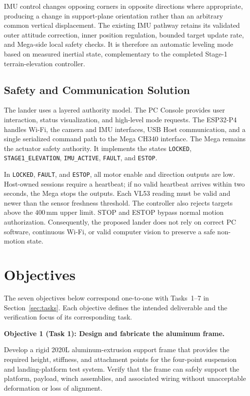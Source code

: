 \documentclass{engr1000j-s2}
\begin{document}
IMU control changes opposing corners in opposite directions where appropriate, producing a change in support-plane orientation rather than an arbitrary common vertical displacement. The existing IMU pathway retains its validated outer attitude correction, inner position regulation, bounded target update rate, and Mega-side local safety checks. It is therefore an automatic leveling mode based on measured inertial state, complementary to the completed Stage-1 terrain-elevation controller.

\subsection*{Safety and Communication Solution}

The lander uses a layered authority model. The PC Console provides user interaction, status visualization, and high-level mode requests. The ESP32-P4 handles Wi-Fi, the camera and IMU interfaces, USB Host communication, and a single serialized command path to the Mega CH340 interface. The Mega remains the actuator safety authority. It implements the states \texttt{LOCKED}, \texttt{STAGE1\_ELEVATION}, \texttt{IMU\_ACTIVE}, \texttt{FAULT}, and \texttt{ESTOP}.

In \texttt{LOCKED}, \texttt{FAULT}, and \texttt{ESTOP}, all motor enable and direction outputs are low. Host-owned sessions require a heartbeat; if no valid heartbeat arrives within two seconds, the Mega stops the outputs. Each VL53 reading must be valid and newer than the sensor freshness threshold. The controller also rejects targets above the $400\,\mathrm{mm}$ upper limit. STOP and ESTOP bypass normal motion authorization. Consequently, the proposed lander does not rely on correct PC software, continuous Wi-Fi, or valid computer vision to preserve a safe non-motion state.

\newpage

\section{Objectives}

The seven objectives below correspond one-to-one with Tasks~1--7 in Section~\ref{sec:tasks}. Each objective defines the intended deliverable and the verification focus of its corresponding task.

\textbf{Objective 1 (Task 1): Design and fabricate the aluminum frame.}

Develop a rigid 2020L aluminum-extrusion support frame that provides the required height, stiffness, and attachment points for the four-point suspension and landing-platform test system. Verify that the frame can safely support the platform, payload, winch assemblies, and associated wiring without unacceptable deformation or loss of alignment.
\end{document}
